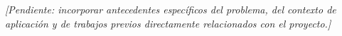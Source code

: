 \textit{[Pendiente: incorporar antecedentes específicos del problema, del contexto de aplicación y de trabajos previos directamente relacionados con el proyecto.]}